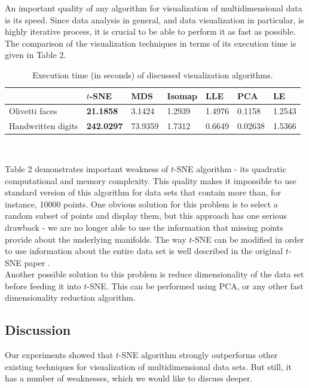 An important quality of any algorithm for visualization of multidimensional data is its speed. Since data analysis in general, and data visualization in particular, is highly iterative process, it is crucial to be able to perform it as fast as possible. The comparison of the visualization techniques in terms of its execution time is given in Table 2.\\

\begin{table}[H]
	\centering
	\begin{tabular}{| l | l | l | l | l | l | l |} 
		\hline
		\quad & $t$-SNE & MDS & Isomap & LLE & PCA & LE \\
		\hline			
		Olivetti faces & \textbf{21.1858} & 3.1424 & 1.2939 & 1.4976 & 0.1158 & 1.2543 \\
		Handwritten digits & \textbf{242.0297} & 73.9359 & 1.7312 & 0.6649 & 0.02638 & 1.5366 \\
		\hline  
	\end{tabular}\\
	\caption{Execution time (in seconds) of discussed visualization algorithms.}
\end{table}

Table 2 demonstrates important weakness of $t$-SNE algorithm - its quadratic computational and memory complexity. This quality makes it impossible to use standard version of this algorithm for data sets that contain more than, for instance, 10000 points. One obvious solution for this problem is to select a random subset of points and display them, but this approach has one serious drawback - we are no longer able to use the information that missing points provide about the underlying manifolds. The way $t$-SNE can be modified in order to use information about the entire data set is well described in the original $t$-SNE paper \cite{tsnearticle}.\\

Another possible solution to this problem is reduce dimensionality of the data set before feeding it into $t$-SNE. This can be performed using PCA, or any other fast dimensionality reduction algorithm.

\subsection{Discussion}

Our experiments showed that $t$-SNE algorithm strongly outperforms other existing techniques for visualization of multidimensional data sets. But still, it has a number of weaknesses, which we would like to discuss deeper.\\

